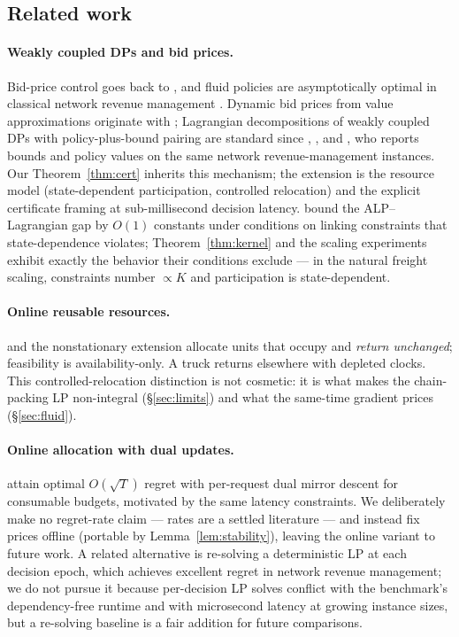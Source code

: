 \documentclass[11pt]{article}
\begin{document}
\subsection{Related work}
\label{sec:related}

\paragraph{Weakly coupled DPs and bid prices.} Bid-price control goes
back to \citet{talluri1998bidprice}, and fluid policies are
asymptotically optimal in classical network revenue management
\citep{gallego1997network}. Dynamic bid prices from value
approximations originate with \citet{adelman2007dynamic};
Lagrangian decompositions of weakly coupled DPs with policy-plus-bound
pairing are standard since \citet{hawkins2003lagrangian},
\citet{adelman2008relaxations}, and \citet{topaloglu2009lagrangian}, who
reports bounds and policy values on the same network revenue-management
instances. Our Theorem~\ref{thm:cert} inherits this mechanism; the
extension is the resource model (state-dependent participation,
controlled relocation) and the explicit certificate framing at
sub-millisecond decision latency. \citet{brownzhang2023strength} bound
the ALP--Lagrangian gap by $O(1)$ constants under conditions on linking
constraints that state-dependence violates; Theorem~\ref{thm:kernel} and
the scaling experiments exhibit exactly the behavior their conditions
exclude --- in the natural freight scaling, constraints number
$\propto K$ and participation is state-dependent.

\paragraph{Online reusable resources.} \citet{zhangcheung2022reusable}
and the nonstationary extension \citet{zhangcheung2025nonstationary}
allocate units that occupy and \emph{return unchanged}; feasibility is
availability-only. A truck returns elsewhere with depleted clocks. This
controlled-relocation distinction is not cosmetic: it is what makes the
chain-packing LP non-integral (\S\ref{sec:limits}) and what the
same-time gradient prices (\S\ref{sec:fluid}).

\paragraph{Online allocation with dual updates.} \citet{balseiro2020dual}
attain optimal $O(\sqrt{T})$ regret with per-request dual mirror descent
for consumable budgets, motivated by the same latency constraints. We
deliberately make no regret-rate claim --- rates are a settled
literature --- and instead fix prices offline (portable by
Lemma~\ref{lem:stability}), leaving the online variant to future work.
A related alternative is re-solving a deterministic LP at each decision
epoch, which achieves excellent regret in network revenue management;
we do not pursue it because per-decision LP solves conflict with the
benchmark's dependency-free runtime and with microsecond latency at
growing instance sizes, but a re-solving baseline is a fair addition
for future comparisons.
\end{document}
